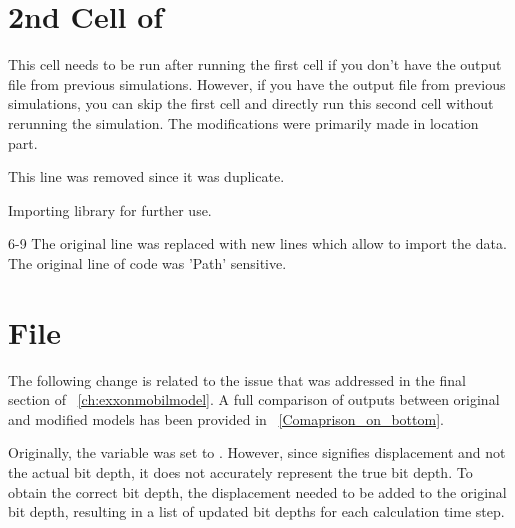 \section{2nd Cell of }
This cell needs to be run after running the first cell if you don't have the output file from previous simulations. However, if you have the output file from previous simulations, you can skip the first cell and directly run this second cell without rerunning the simulation. The modifications were primarily made in location part.
\begin{codemodifications}

\begin{codemodification}{1}
This line was removed since it was duplicate.
\end{codemodification}

\begin{codemodification}{5}
Importing  library for further use.
\end{codemodification}

\begin{codemodification}{6-9}
The original line was replaced with new lines which allow to import the data.  The original line of code was 'Path' sensitive.
\end{codemodification}

\end{codemodifications}

\section{File }
The following change is related to the issue that was addressed in the final section of \chaptername~\ref{ch:exxonmobilmodel}.
A full comparison of outputs between original and modified models has been provided in \figurename~\ref{Comaprison_on_bottom}.
\begin{codemodifications}

\begin{codemodification}{29}
Originally, the variable  was set to . However, since  signifies displacement and not the actual bit depth, it does not accurately represent the true bit depth. To obtain the correct bit depth, the displacement needed to be added to the original bit depth, resulting in a list of updated bit depths for each calculation time step.
\end{codemodification}
\end{codemodifications}

